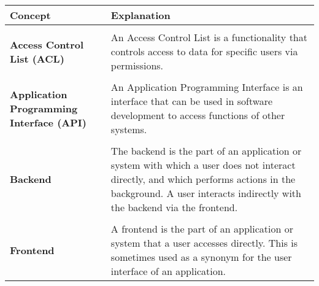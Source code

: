 \chapter{\glossaryname}

\begin{longtable}{p{5cm}p{10cm}}
    \textbf{Concept} & \textbf{Explanation} \\
    \hline
    \\
    \textbf{Access Control List (ACL)} & An Access Control List is a functionality that controls access to data for specific users via permissions.\\
    \\
    \textbf{Application Programming Interface (API)} & An Application Programming Interface is an interface that can be used in software development to access functions of other systems.\\
    \\
    \textbf{Backend} & The backend is the part of an application or system with which a user does not interact directly, and which performs actions in the background. A user interacts indirectly with the backend via the frontend.\\
    \\
    \textbf{Frontend} & A frontend is the part of an application or system that a user accesses directly. This is sometimes used as a synonym for the user interface of an application.
\end{longtable}
